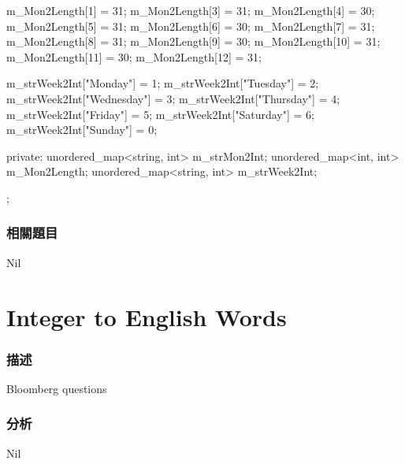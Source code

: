 \begin{Code}
{{        m_Mon2Length[1] = 31;
        m_Mon2Length[3] = 31;
        m_Mon2Length[4] = 30;
        m_Mon2Length[5] = 31;
        m_Mon2Length[6] = 30;
        m_Mon2Length[7] = 31;
        m_Mon2Length[8] = 31;
        m_Mon2Length[9] = 30;
        m_Mon2Length[10] = 31;
        m_Mon2Length[11] = 30;
        m_Mon2Length[12] = 31;

        m_strWeek2Int["Monday"] = 1;
        m_strWeek2Int["Tuesday"] = 2;
        m_strWeek2Int["Wednesday"] = 3;
        m_strWeek2Int["Thursday"] = 4;
        m_strWeek2Int["Friday"] = 5;
        m_strWeek2Int["Saturday"] = 6;
        m_strWeek2Int["Sunday"] = 0;
    }
private:
    unordered_map<string, int> m_strMon2Int;
    unordered_map<int, int> m_Mon2Length;
    unordered_map<string, int> m_strWeek2Int;
};
\end{Code}


\subsubsection{相關題目}
Nil
\section{Integer to English Words} %
\label{sec:integer-to-english-words}

\subsubsection{描述}
Bloomberg questions

\subsubsection{分析}
Nil


